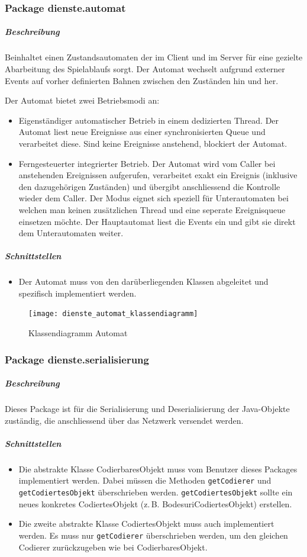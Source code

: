 \documentclass[12pt,halfparskip]{scrartcl}
\begin{document}
\clearpage
\subsubsection{Package dienste.automat}
\label{ssub:package_dienste}
\subparagraph{Beschreibung}
Beinhaltet einen Zustandsautomaten der im Client und im Server für eine gezielte Abarbeitung des Spielablaufs sorgt. Der Automat wechselt aufgrund externer Events auf vorher definierten Bahnen zwischen den Zuständen hin und her.

Der Automat bietet zwei Betriebsmodi an:
\begin{itemize}
	\item Eigenständiger automatischer Betrieb in einem dedizierten Thread. Der Automat liest neue Ereignisse aus einer synchronisierten Queue und verarbeitet diese. Sind keine Ereignisse anstehend, blockiert der Automat.
	\item Ferngesteuerter integrierter Betrieb. Der Automat wird vom Caller bei anstehenden Ereignissen aufgerufen, verarbeitet exakt ein Ereignis (inklusive den dazugehörigen Zuständen) und übergibt anschliessend die Kontrolle wieder dem Caller. Der Modus eignet sich speziell für Unterautomaten bei welchen man keinen zusätzlichen Thread und eine seperate Ereignisqueue einsetzen möchte. Der Hauptautomat liest die Events ein und gibt sie direkt dem Unterautomaten weiter. 
\end{itemize}

\subparagraph{Schnittstellen}
\begin{itemize}
	\item Der Automat muss von den darüberliegenden Klassen abgeleitet und spezifisch implementiert werden.
\end{itemize}	

\begin{figure}[h]
	\centering
	\texttt{[image: dienste\_automat\_klassendiagramm]}
	\caption{Klassendiagramm Automat}
	\label{fig:dienste_automat_klassendiagramm}
\end{figure}

\clearpage
\subsubsection{Package dienste.serialisierung}

\subparagraph{Beschreibung}
Dieses Package ist für die Serialisierung und Deserialisierung der Java-Objekte zuständig, die anschliessend über das Netzwerk versendet werden.

\subparagraph{Schnittstellen}
\begin{itemize}
	\item Die abstrakte Klasse CodierbaresObjekt muss vom Benutzer dieses Packages implementiert werden. Dabei müssen die Methoden \texttt{getCodierer} und \texttt{getCodiertesObjekt} überschrieben werden. \texttt{getCodiertesObjekt} sollte ein neues konkretes CodiertesObjekt (z.\,B. BodesuriCodiertesObjekt) erstellen.
	\item Die zweite abstrakte Klasse CodiertesObjekt muss auch implementiert werden. Es muss nur \texttt{getCodierer} überschrieben werden, um den gleichen Codierer zurückzugeben wie bei CodierbaresObjekt.
\end{itemize}
\end{document}
